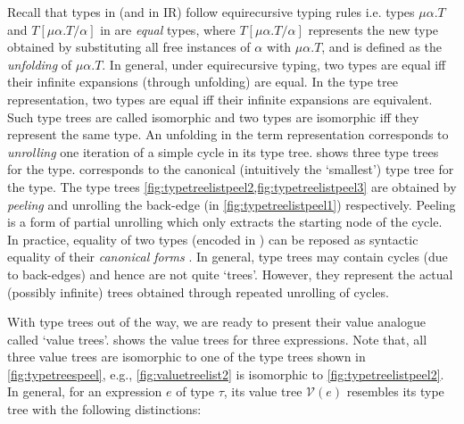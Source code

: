 

Recall that types in \SpecL{} (and in IR) follow equirecursive typing rules i.e. types
$\mu \alpha. T$ and $T[\mu \alpha. T/\alpha]$ in \typegrammar{} are {\em equal} types,
where $T[\mu \alpha. T/\alpha]$ represents the new type obtained by substituting all free
instances of $\alpha$ with $\mu \alpha. T$, and is defined as the {\em unfolding} of $\mu \alpha. T$.
In general, under equirecursive typing, two types are equal iff their infinite expansions (through unfolding) are equal.
In the type tree representation, two types are equal iff their infinite expansions are equivalent.
Such type trees are called isomorphic and two types are isomorphic iff they represent the same type.
An unfolding in the term representation corresponds to {\em unrolling} one iteration of a simple cycle in its type tree.
 shows three type trees for the  type.
 corresponds to the canonical (intuitively the `smallest') type tree for the  type.
The type trees \cref{fig:typetreelistpeel2,fig:typetreelistpeel3} are obtained by {\em peeling} and unrolling
the back-edge  (in \cref{fig:typetreelistpeel1}) respectively.
Peeling is a form of partial unrolling which only extracts the starting node of the cycle.
In practice, equality of two types (encoded in \typegrammar{}) can be reposed as syntactic
equality of their {\em canonical forms} \cite{canonicalrecursivetypes}.
In general, type trees may contain cycles (due to back-edges) and hence are not quite `trees'.
However, they represent the actual (possibly infinite) trees obtained through repeated unrolling of cycles.



With type trees out of the way, we are ready to present their value analogue called `value trees'.
 shows the value trees for three  expressions.
Note that, all three value trees are isomorphic to one of the
 type trees shown in \cref{fig:typetreespeel}, e.g.,
\cref{fig:valuetreelist2} is isomorphic to \cref{fig:typetreelistpeel2}.
In general, for an expression $e$ of type $\tau$, its value tree $\mathcal{V}(e)$ resembles
its type tree with the following distinctions:

